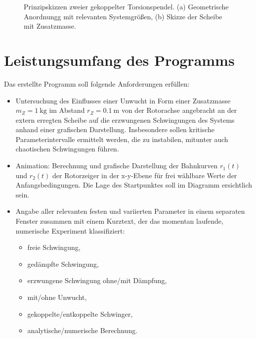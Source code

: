 \begin{figure}[htbp]
\begin{subfigure}[c]{0.5\textwidth}
            \end{subfigure}
            \caption[Prinzipskizzen zweier gekoppelter Torsionspendel]{Prinzipskizzen zweier gekoppelter Torsionspendel. (a) Geometrische Anordnungg mit relevanten Systemgrößen, (b) Skizze der Scheibe mit Zusatzmasse.}\label{Prinzipskizzen}
        \end{figure}

    \section{Leistungsumfang des Programms}

        Das erstellte Programm soll folgende Anforderungen erfüllen:
        \begin{itemize}
            \item Untersuchung des Einflusses einer Unwucht in Form einer Zusatzmasse \(m_Z = \qty{1}{\kilo\gram}\) im Abstand \(r_Z = \qty{0.1}{\metre}\) von der Rotorachse angebracht an der extern erregten Scheibe auf die erzwungenen Schwingungen des Systems anhand einer grafischen Darstellung.
            Insbesondere sollen kritische Parameterintervalle ermittelt werden, die zu instabilen, mitunter auch chaotischen Schwingungen führen.
            \item Animation: Berechnung und grafische Darstellung der Bahnkurven \(r_1(t)\) und \(r_2(t)\) der Rotorzeiger in der x-y-Ebene für frei wählbare Werte der Anfangsbedingungen.
            Die Lage des Startpunktes soll im Diagramm ersichtlich sein.
            \item Angabe aller relevanten festen und variierten Parameter in einem separaten Fenster zusammen mit einem Kurztext, der das momentan laufende, numerische Experiment klassifiziert:
            \begin{itemize}
                \item freie Schwingung,
                \item gedämpfte Schwingung,
                \item erzwungene Schwingung ohne/mit Dämpfung,
                \item mit/ohne Unwucht,
                \item gekoppelte/entkoppelte Schwinger,
                \item analytische/numerische Berechnung.
            \end{itemize}
        \end{itemize}